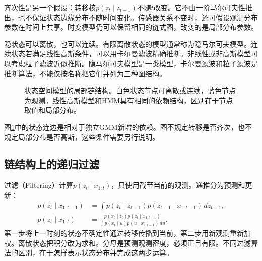 齐次性是另一个假设：转移核$p(z_t\mid z_{t-1})$不随$t$改变。它不由一阶马尔可夫性推出，也不保证状态边缘分布不随时间变化。传感器关系不变时，还可假设观测分布参数在时间上共享。时变模型仍可以保留相同的链式图，改变的是局部分布参数。

隐状态可以离散，也可以连续。有限离散状态的模型通常称为隐马尔可夫模型。连续状态若满足线性高斯条件，可以用卡尔曼滤波精确推断。非线性或非高斯模型可以考虑粒子滤波近似推断。隐马尔可夫模型是一类模型，卡尔曼滤波和粒子滤波是推断算法，不能仅按名称把它们并列为三种图结构。

\begin{figure}[htbp]
\centering
{}
\caption{状态空间模型的局部链结构。白色状态节点可离散或连续，蓝色节点为观测。线性高斯模型和HMM具有相同的依赖结构，区别在于节点取值和局部分布。}
\label{fig:bayes-ssm-structure}
\end{figure}

图\ref{fig:bayes-ssm-structure}中的状态连边是相对于独立GMM新增的依赖。图不规定转移是否齐次，也不规定局部分布是否高斯，这些条件需要另行说明。

\subsection{链结构上的递归过滤}
过滤（Filtering）计算$p(z_t\mid x_{1:t})$，只使用截至当前的观测。递推分为预测和更新：
\begin{align}
 p(z_t\mid x_{1:t-1})
 &=\int p(z_t\mid z_{t-1})p(z_{t-1}\mid x_{1:t-1})\,dz_{t-1},\\
 p(z_t\mid x_{1:t})
 &=\frac{p(x_t\mid z_t)p(z_t\mid x_{1:t-1})}
 {\int p(x_t\mid u)p(u\mid x_{1:t-1})\,du}.
 \label{eq:bayes-filter-recursion}
\end{align}
第一步将上一时刻的状态不确定性通过转移传播到当前，第二步用新观测重新加权。离散状态把积分改为求和。分母是预测观测密度，必须正且有限。不同过滤算法的区别，在于怎样表示状态分布并完成这两步运算。

